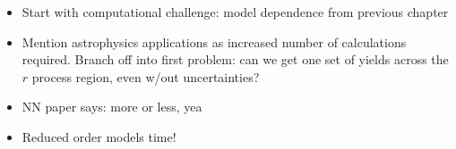 \documentclass[../thesis.tex]{subfiles}
\begin{document}
\vspace{-1\baselineskip}

\begin{itemize}
	\item Start with computational challenge: model dependence from previous chapter
	\item Mention astrophysics applications as increased number of calculations required. Branch off into first problem: can we get one set of yields across the $r$ process region, even w/out uncertainties?
	\item NN paper says: more or less, yea
	\item Reduced order models time!
\end{itemize}
\end{document}
